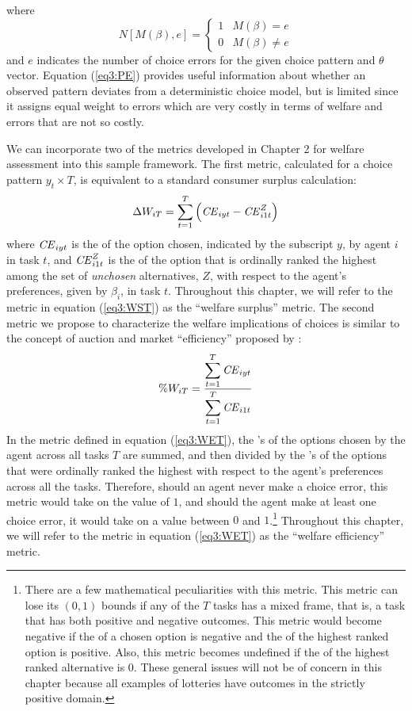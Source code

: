 \documentclass[../main.tex]{subfiles}
\begin{document}
\noindent where
\begin{equation}
	\label{eq3:NMB}
	N[M(\beta), e] =
	\begin{cases}
		1 & M(\beta) = e\\
		0 & M(\beta) \neq e
	\end{cases}
\end{equation}
\noindent and $e$ indicates the number of choice errors for the given choice pattern and $\theta$ vector.
Equation (\ref{eq3:PE}) provides useful information about whether an observed pattern deviates from a deterministic choice model, but is limited since it assigns equal weight to errors which are very costly in terms of welfare and errors that are not so costly.

We can incorporate two of the metrics developed in Chapter 2 for welfare assessment into this sample framework.
The first metric, calculated for a choice pattern $y_t \times T$, is equivalent to a standard consumer surplus calculation:
\begin{equation}
	\label{eq3:WST}
	\Delta W_{iT} = \sum_{t=1}^T \left( {\mathit{CE}}_{iyt} - {\mathit{CE}}_{i1t}^Z \right)
\end{equation}
\noindent where ${\mathit{CE}}_{iyt}$ is the {\CE} of the option chosen, indicated by the subscript $y$, by agent $i$ in task $t$, and ${\mathit{CE}}_{i1t}^Z$ is the {\CE} of the option that is ordinally ranked the highest among the set of \textit{unchosen} alternatives, $Z$, with respect to the agent's preferences, given by $\beta_i$, in task $t$.
Throughout this chapter, we will refer to the metric in equation (\ref{eq3:WST}) as the \enquote{welfare surplus} metric.
The second metric we propose to characterize the welfare implications of choices is similar to the concept of auction and market \enquote{efficiency} proposed by \textcite{Plott1978}:
\begin{equation}
	\label{eq3:WET}
	\%W_{iT} = \frac{\displaystyle\sum_{t=1}^{T} {\mathit{CE}}_{iyt} }{\displaystyle\sum_{t=1}^{T} {\mathit{CE}}_{i1t}}
\end{equation}
\noindent In the metric defined in equation (\ref{eq3:WET}), the {\CE}'s of the options chosen by the agent across all tasks $T$ are summed, and then divided by the {\CE}'s of the options that were ordinally ranked the highest with respect to the agent's preferences across all the tasks.
Therefore, should an agent never make a choice error, this metric would take on the value of $1$, and should the agent make at least one choice error, it would take on a value between $0$ and $1$.\footnote{
	There are a few mathematical peculiarities with this metric.
	This metric can lose its $(0,1)$ bounds if any of the $T$ tasks has a mixed frame, that is, a task that has both positive and negative outcomes.
	This metric would become negative if the {\CE} of a chosen option is negative and the {\CE} of the highest ranked option is positive.
	Also, this metric becomes undefined if the {\CE} of the highest ranked alternative is $0$.
	These general issues will not be of concern in this chapter because all examples of lotteries have outcomes in the strictly positive domain.
}
Throughout this chapter, we will refer to the metric in equation (\ref{eq3:WET}) as the \enquote{welfare efficiency} metric.
\end{document}
